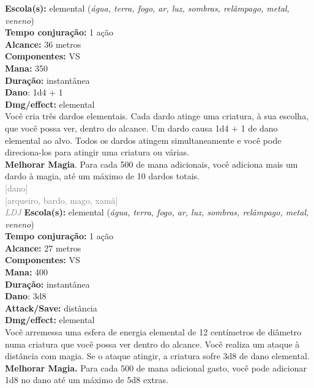 \documentclass{RPG_Adventure}[2021/10/20]
\begin{document}
{\small \t \textbf{Escola(s):} elemental (\textit{água, terra, fogo, ar, luz, sombras, relâmpago, metal, veneno})\\\t \textbf{Tempo conjuração:} 1 ação\\\t \textbf{Alcance:} 36 metros\\\t \textbf{Componentes:} VS\\\t \textbf{Mana:} 350\\\t \textbf{Duração:} instantânea\\\t \textbf{Dano}: 1d4 + 1\\\t \textbf{Dmg/effect:} elemental\\}
{\normalsize Você cria três dardos elementais. Cada dardo atinge uma criatura, à sua escolha, que você possa ver, dentro do alcance. Um dardo causa 1d4 + 1 de dano elemental ao alvo. Todos os dardos atingem simultaneamente e você pode direciona-los para atingir uma criatura ou várias.\\\t \textbf{Melhorar Magia}. Para cada 500 de mana adicionais, você adiciona mais um dardo à magia, até um máximo de 10 dardos totais.\\}
{\scriptsize \textcolor{gray}{[dano]\\}}
{\scriptsize \textcolor{gray}{[arqueiro, bardo, mago, xamã]\\}}
{\tiny \textcolor{gray}{\textit{LDJ}}}\jump{}
{\small \t \textbf{Escola(s):} elemental (\textit{água, terra, fogo, ar, luz, sombras, relâmpago, metal, veneno})\\\t \textbf{Tempo conjuração:} 1 ação\\\t \textbf{Alcance:} 27 metros\\\t \textbf{Componentes:} VS\\\t \textbf{Mana:} 400\\\t \textbf{Duração:} instantânea\\\t \textbf{Dano}: 3d8\\\t \textbf{Attack/Save:} distância\\\t \textbf{Dmg/effect:} elemental\\}
{\normalsize Você arremessa uma esfera de energia elemental de 12 centímetros de diâmetro numa criatura que você possa ver dentro do alcance. Você realiza um ataque à distância com magia. Se o ataque atingir, a criatura sofre 3d8 de dano elemental.\\\t \textbf{Melhorar Magia.} Para cada 500 de mana adicional gasto, você pode adicionar 1d8 no dano até um máximo de 5d8 extras.\\}
\end{document}
